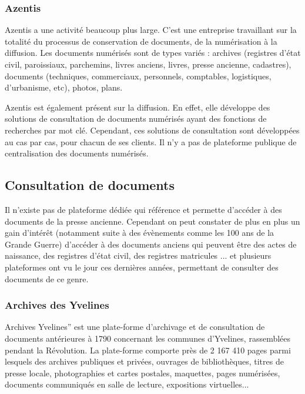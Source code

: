         \subsubsection{Azentis}
        \label{subsubsec:azentis}
        Azentis a une activité beaucoup plus large. C’est une entreprise travaillant sur la totalité du processus de conservation
        de documents, de la  numérisation à la diffusion. Les documents numérisés sont de types variés : archives (registres d'état civil,
        paroissiaux, parchemins, livres anciens, livres, presse ancienne, cadastres), documents (techniques, commerciaux, personnels,
        comptables, logistiques, d'urbanisme, etc), photos, plans.

        Azentis est également présent sur la diffusion. En effet, elle développe des solutions de consultation de documents numérisés
        ayant des fonctions de recherches par mot clé. Cependant, ces solutions de consultation sont développées au cas par cas,
        pour chacun de ses clients. Il n'y a pas de plateforme publique de centralisation des documents numérisés.

    \subsection{Consultation de documents}
    \label{subsec:consultation}
    Il n’existe pas de plateforme dédiée qui référence et permette d’accéder à des documents de la presse ancienne. Cependant
    on peut constater de plus en plus un gain d’intérêt (notamment suite à des évènements comme les 100 ans de la Grande Guerre)
    d’accéder à des documents anciens qui peuvent être des actes de naissance, des registres d’état civil, des registres matricules ...
    et plusieurs plateformes ont vu le jour ces dernières années, permettant de consulter des documents de ce genre.


        \subsubsection{Archives des Yvelines}
        \label{subsubsec:yvelines}
        Archives Yvelines” est une plate-forme d’archivage et de consultation de documents antérieures
        à 1790 concernant les communes d’Yvelines, rassemblées pendant la Révolution. La plate-forme comporte
        près de 2 167 410 pages parmi lesquels des archives publiques et privées, ouvrages de bibliothèques,
        titres de presse locale, photographies et cartes postales, maquettes, pages numérisées,
        documents communiqués en salle de lecture, expositions virtuelles...

